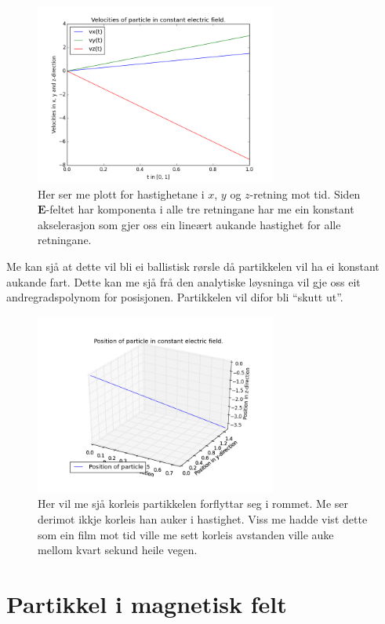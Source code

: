 \documentclass[11pt, a4paper]{article}
\begin{document}
  \begin{figure}[H]
    \centering
    \includegraphics[width=300px]{C2.png}
    \caption{Her ser me plott for hastighetane i $x$, $y$ og $z$-retning mot tid. Siden $\mathbf{E}$-feltet har komponenta i alle tre retningane har me ein konstant akselerasjon 
    som gjer oss ein lineært aukande hastighet for alle retningane.}
  \end{figure}
  Me kan sjå at dette vil bli ei ballistisk rørsle då partikkelen vil ha ei konstant aukande fart. Dette kan me sjå frå den analytiske løysninga vil gje oss eit andregradspolynom for 
  posisjonen. Partikkelen vil difor bli ``skutt ut''.

  \begin{figure}[H]
    \centering
    \includegraphics[width=300px]{D.png}
    \caption{Her vil me sjå korleis partikkelen forflyttar seg i rommet. Me ser derimot ikkje korleis han auker i hastighet. Viss me hadde vist dette som ein film mot tid ville me 
    sett korleis avstanden ville auke mellom kvart sekund heile vegen.} %
  \end{figure}


\newpage
\section{Partikkel i magnetisk felt}
\end{document}
